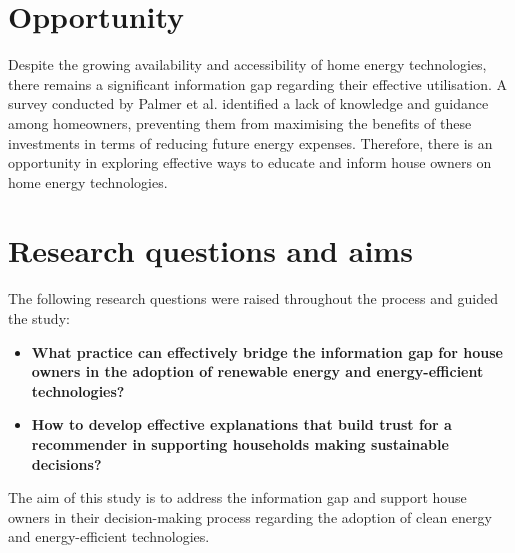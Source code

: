 \section{Opportunity}

Despite the growing availability and accessibility of home energy technologies, there remains a significant information gap regarding their effective utilisation. 
A survey conducted by Palmer et al. \cite{informationgap} identified a lack of knowledge and guidance among homeowners, preventing them from maximising the benefits of these investments in terms of reducing future energy expenses. 
Therefore, there is an opportunity in exploring effective ways to educate and inform house owners on home energy technologies. 


\section{Research questions and aims}

The following research questions were raised throughout the process and guided the study: 
\begin{itemize}
  \item \textbf{What practice can effectively bridge the information gap for house owners in the adoption of renewable energy and energy-efficient technologies?}
\end{itemize}

\begin{itemize}
  \item \textbf{How to develop effective explanations that build trust for a recommender in supporting households making sustainable decisions? }
\end{itemize}

The aim of this study is to address the information gap and support house owners in their decision-making process regarding the adoption of clean energy and energy-efficient technologies. 

